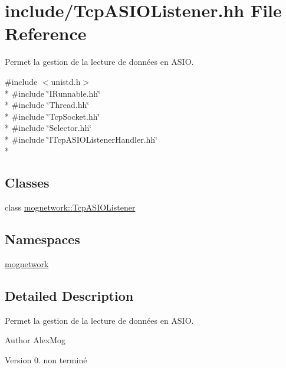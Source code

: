\hypertarget{_tcp_a_s_i_o_listener_8hh}{\section{include/\-Tcp\-A\-S\-I\-O\-Listener.hh File Reference}
\label{_tcp_a_s_i_o_listener_8hh}
}


Permet la gestion de la lecture de données en A\-S\-I\-O.  


{\ttfamily \#include $<$unistd.\-h$>$}\\*
{\ttfamily \#include \char`\"{}I\-Runnable.\-hh\char`\"{}}\\*
{\ttfamily \#include \char`\"{}Thread.\-hh\char`\"{}}\\*
{\ttfamily \#include \char`\"{}Tcp\-Socket.\-hh\char`\"{}}\\*
{\ttfamily \#include \char`\"{}Selector.\-hh\char`\"{}}\\*
{\ttfamily \#include \char`\"{}I\-Tcp\-A\-S\-I\-O\-Listener\-Handler.\-hh\char`\"{}}\\*
\subsection*{Classes}
\begin{DoxyCompactItemize}
\item 
class \hyperlink{classmognetwork_1_1_tcp_a_s_i_o_listener}{mognetwork\-::\-Tcp\-A\-S\-I\-O\-Listener}
\end{DoxyCompactItemize}
\subsection*{Namespaces}
\begin{DoxyCompactItemize}
\item 
\hyperlink{namespacemognetwork}{mognetwork}
\end{DoxyCompactItemize}


\subsection{Detailed Description}
Permet la gestion de la lecture de données en A\-S\-I\-O. \begin{DoxyAuthor}{Author}
Alex\-Mog 
\end{DoxyAuthor}
\begin{DoxyVersion}{Version}
0.  non terminé 
\end{DoxyVersion}
